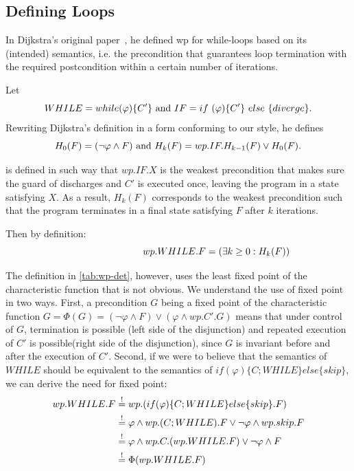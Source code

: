 \subsection{Defining Loops}\label{sec:define loops}
In Dijkstra's original paper~\cite{dijkstra75}, he defined wp for while-loops based on its (intended) semantics, i.e. the precondition that guarantees loop termination with the required postcondition within a certain number of iterations. 

Let 
\[
WHILE=while(\varphi)\{C'\}
\\\text{ and } \\ 
IF=  if\ (\varphi)\{C'\}\ else\ \{diverge\}. 
\] 
Rewriting Dijkstra's definition in a form conforming to our style, he defines 
\[
H_0(F)=( \neg \varphi\wedge F )
\\\text{ and } \\ 
H_k(F)=wp.IF.H_{k-1}(F) \vee H_0(F). 
\]

 is defined in such way that $wp.IF.X$ is the weakest precondition that makes sure the guard of  discharges and $C'$ is executed once, leaving the program in a state satisfying $X$.
As a result, $H_k(F)$ corresponds to the weakest precondition such that the program terminates in a final state satisfying $F$ after  $k$ iterations.



Then by definition: 
\begin{equation}
\hspace{2.8cm} wp.WHILE.F=(\exists k\geq 0: H_k(F))  \label{eq:while}
\end{equation}


The definition in \autoref{tab:wp-det}, however, uses the least fixed point of the characteristic function that is not obvious. 
We understand the use of fixed point in two ways. 
First, a precondition $G$ being a fixed point of the characteristic function $G= \Phi(G)=(\neg\varphi\wedge F)\vee(\varphi\wedge wp.C'.G)$ means that under control of $G$, termination is possible (left side of the disjunction) and repeated execution of $C'$ is possible(right side of the disjunction), since $G$ is invariant before and after the execution of $C'$. 
Second, if we were to believe that the semantics of $WHILE$ should be equivalent to the semantics of $if(\varphi)\{C;WHILE\}else\{skip\}$, we can derive the need for fixed point: 
\begin{align*} 
  wp.WHILE.F    & \stackrel{!}{=} wp.(if(\varphi)\{C;WHILE\}else\{skip\}.F) \\
                & \stackrel{!}{=} \varphi\wedge wp.(C;WHILE).F \vee \neg\varphi\wedge wp.skip.F\\ 
                & \stackrel{!}{=} \varphi\wedge wp.C.(wp.WHILE.F) \vee \neg\varphi\wedge F\\ 
                & \stackrel{!}{=} \Phi(wp.WHILE.F)\\ 
\end{align*}

